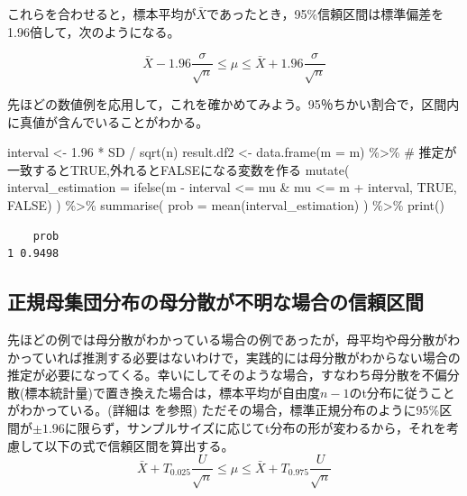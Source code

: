 \documentclass[
  a4paper,
]{ltjsbook}
\newenvironment{Shaded}{\begin{snugshade}}{\end{snugshade}}
\newcommand{\AttributeTok}[1]{\textcolor[rgb]{0.40,0.45,0.13}{#1}}
\newcommand{\CommentTok}[1]{\textcolor[rgb]{0.37,0.37,0.37}{#1}}
\newcommand{\ConstantTok}[1]{\textcolor[rgb]{0.56,0.35,0.01}{#1}}
\newcommand{\FloatTok}[1]{\textcolor[rgb]{0.68,0.00,0.00}{#1}}
\newcommand{\FunctionTok}[1]{\textcolor[rgb]{0.28,0.35,0.67}{#1}}
\newcommand{\NormalTok}[1]{\textcolor[rgb]{0.00,0.23,0.31}{#1}}
\newcommand{\OtherTok}[1]{\textcolor[rgb]{0.00,0.23,0.31}{#1}}
\newcommand{\SpecialCharTok}[1]{\textcolor[rgb]{0.37,0.37,0.37}{#1}}
\begin{document}
これらを合わせると，標本平均が\(\bar{X}\)であったとき，95\%信頼区間は標準偏差を1.96倍して，次のようになる。

\[ \bar{X} - 1.96 \frac{\sigma}{\sqrt{n}} \le \mu \le \bar{X} + 1.96 \frac{\sigma}{\sqrt{n}} \]

先ほどの数値例を応用して，これを確かめてみよう。95％ちかい割合で，区間内に真値が含んでいることがわかる。

\begin{Shaded}
\begin{Highlighting}[]
\NormalTok{interval }\OtherTok{\textless{}{-}} \FloatTok{1.96} \SpecialCharTok{*}\NormalTok{ SD }\SpecialCharTok{/} \FunctionTok{sqrt}\NormalTok{(n)}
\NormalTok{result.df2 }\OtherTok{\textless{}{-}} \FunctionTok{data.frame}\NormalTok{(}\AttributeTok{m =}\NormalTok{ m) }\SpecialCharTok{\%\textgreater{}\%}
  \CommentTok{\# 推定が一致するとTRUE,外れるとFALSEになる変数を作る}
  \FunctionTok{mutate}\NormalTok{(}
    \AttributeTok{interval\_estimation =} \FunctionTok{ifelse}\NormalTok{(m }\SpecialCharTok{{-}}\NormalTok{ interval }\SpecialCharTok{\textless{}=}\NormalTok{ mu }\SpecialCharTok{\&}\NormalTok{ mu }\SpecialCharTok{\textless{}=}\NormalTok{ m }\SpecialCharTok{+}\NormalTok{ interval, }\ConstantTok{TRUE}\NormalTok{, }\ConstantTok{FALSE}\NormalTok{)}
\NormalTok{  ) }\SpecialCharTok{\%\textgreater{}\%}
  \FunctionTok{summarise}\NormalTok{(}
    \AttributeTok{prob =} \FunctionTok{mean}\NormalTok{(interval\_estimation)}
\NormalTok{  ) }\SpecialCharTok{\%\textgreater{}\%}
  \FunctionTok{print}\NormalTok{()}
\end{Highlighting}
\end{Shaded}

\begin{verbatim}
    prob
1 0.9498
\end{verbatim}

\subsection{正規母集団分布の母分散が不明な場合の信頼区間}\label{ux6b63ux898fux6bcdux96c6ux56e3ux5206ux5e03ux306eux6bcdux5206ux6563ux304cux4e0dux660eux306aux5834ux5408ux306eux4fe1ux983cux533aux9593}

先ほどの例では母分散がわかっている場合の例であったが，母平均や母分散がわかっていれば推測する必要はないわけで，実践的には母分散がわからない場合の推定が必要になってくる。幸いにしてそのような場合，すなわち母分散を不偏分散(標本統計量)で置き換えた場合は，標本平均が自由度\(n-1\)のt分布に従うことがわかっている。(詳細は
\textcite{kosugi2023} を参照)
ただその場合，標準正規分布のように95\%区間が\(\pm 1.96\)に限らず，サンプルサイズに応じてt分布の形が変わるから，それを考慮して以下の式で信頼区間を算出する。
\[ \bar{X} + T_{0.025}\frac{U}{\sqrt{n}} \le \mu \le \bar{X} + T_{0.975}\frac{U}{\sqrt{n}} \]
\end{document}
